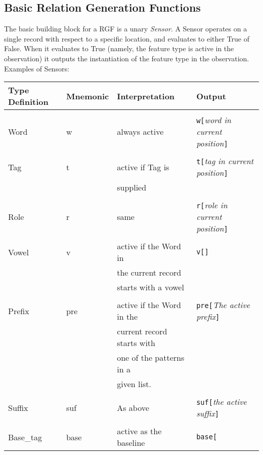 \documentclass[11pt]{article}
\begin{document}
\subsection*{Basic Relation Generation Functions}

The basic building block for a RGF is a unary {\em Sensor}. 
A Sensor operates on a single record with respect to a specific location, 
and evaluates to either True of False. When it evaluates to True (namely, 
the feature type is active in the observation) it outputs the instantiation
of the feature type in the observation. Examples of Sensors: 

\begin{tabular}{llll} 
\noindent Type Definition & Mnemonic  & Interpretation            &  Output  \\
\hline \\
 Word           & w         & always active             &  {\tt w[}{\em word
in current position}{\tt ]} \\ \\
 Tag            & t         & active if Tag is          &  {\tt t[}{\em tag in
current position}{\tt ]} \\ 
                &           & supplied                  &  \\ \\
 Role           & r         & same                      & {\tt r[}{\em role
in current position}{\tt ]} \\ \\
 Vowel          & v         & active if the Word in     & {\tt v[]} \\
                &           & the current record        & \\
                &           & starts with a vowel       & \\ \\
 Prefix         & pre       & active if the Word in the & {\tt pre[}{\em The
 active prefix}{\tt ]} \\
                &           & current record starts with& \\
                &           & one of the patterns in a  & \\
                &           & given list.               & \\ \\
 Suffix         & suf       & As above                  & {\tt suf[}{\em the
active suffix}{\tt ]} \\ \\
 Base\_tag      & base      & active as the baseline    & {\tt base[}

\end{tabular}
\end{document}
